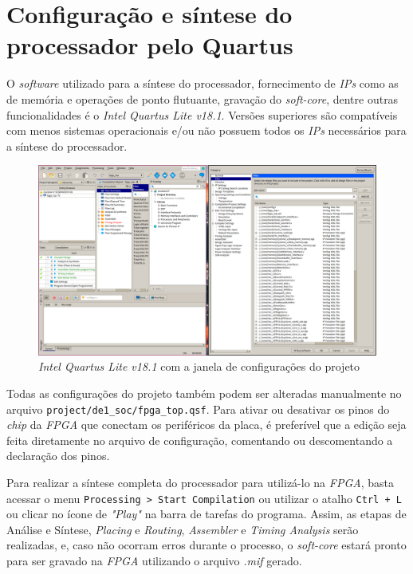 \section{Configuração e síntese do processador pelo Quartus}
    { O \textit{software} utilizado para a síntese do processador, fornecimento
        de \textit{IPs} como as de memória e operações de ponto flutuante,
        gravação do \textit{soft-core}, dentre outras funcionalidades é o
        \textit{Intel Quartus Lite v18.1}. Versões superiores são compatíveis com
        menos sistemas operacionais e/ou não possuem todos os \textit{IPs}
        necessários para a síntese do processador.
    }
    \begin{figure}[H]
    \centering
        \includegraphics[width=.9\linewidth]{../images/quartus/files_config.png}
        \caption{\textit{Intel Quartus Lite v18.1} com a janela de configurações
            do projeto}\label{fig:quartus_files_config}
    \end{figure}

    { Todas as configurações do projeto também podem ser alteradas manualmente
        no arquivo \texttt{project/de1\_soc/fpga\_top.qsf}. Para ativar ou desativar
        os pinos do \textit{chip} da \textit{FPGA} que conectam os periféricos
        da placa, é preferível que a edição seja feita diretamente no arquivo
        de configuração, comentando ou descomentando a declaração dos pinos.
    }

    { Para realizar a síntese completa do processador para utilizá-lo na \textit{FPGA},
        basta acessar o menu \texttt{Processing > Start Compilation} ou utilizar
        o atalho \texttt{Ctrl + L} ou clicar no ícone de \textit{"Play"}
        na barra de tarefas do programa. Assim, as etapas de Análise e Síntese,
        \textit{Placing} e \textit{Routing}, \textit{Assembler} e
        \textit{Timing Analysis} serão realizadas, e, caso não ocorram erros
        durante o processo, o \textit{soft-core} estará pronto para ser
        gravado na \textit{FPGA} utilizando o arquivo \textit{.mif} gerado.
    }


